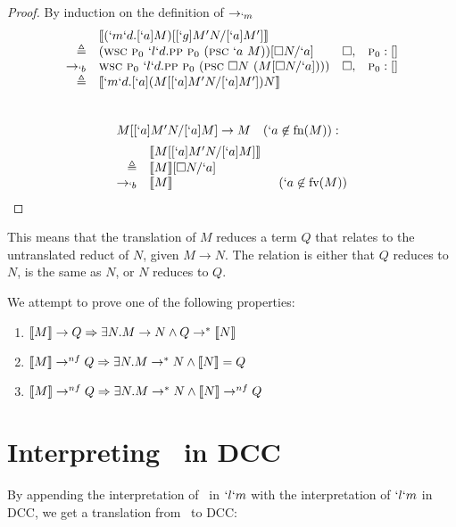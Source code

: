 \begin{proof}{By induction on the definition of $\rightarrow_{`m}$}
\[\begin{array}{rlrl}
               & \tr{(`m`d.[`a]M)[[`g]M^\prime N/[`a]M^\prime]}\\
    \triangleq & (\wsc\ \gp\ `l`d.\pp\ \gp\ (\psc\ `a\ M))[\square N/`a]         & \square, & \gp:[]  \\
    \tob\      & \wsc\ \gp\ `l`d.\pp\ \gp\ (\psc\ \square N\ (M[\square N/`a]))) & \square, & \gp:[]  \\
    \triangleq & \tr{`m`d.[`a](M[[`a]M^\prime N/[`a]M^\prime])N}
\end{array}
\]
\\ 
\[
\begin{array}{rlrl}
  \prooflabel{M[[`a]M^\prime N/[`a]M] \to M \hspace{10pt} (`a \not\in \fn(M)):} \\
               & \tr{M[[`a]M^\prime N/[`a]M]} \\
    \triangleq & \tr{M}[\square N/`a] \\
    \tob\      & \tr{M} & (`a \not\in \fv(M))
\end{array}
\]
\end{proof}

This means that the translation of $M$ reduces a term $Q$ that relates to the untranslated reduct of $N$, given $M \to N$.
The relation is either that $Q$ reduces to $N$, is the same as $N$, or $N$ reduces to $Q$.

\begin{theorem}

\end{theorem}

We attempt to prove one of the following properties:
\begin{enumerate}
  \item $\llbracket M \rrbracket \to Q \Rightarrow \exists N. M \to N \land Q \to^* \llbracket N \rrbracket$
  \item $\llbracket M \rrbracket \to^{nf} Q \Rightarrow \exists N. M \to^* N \land \llbracket N \rrbracket = Q$
  \item $\llbracket M \rrbracket \to^{nf} Q \Rightarrow \exists N. M \to^* N \land \llbracket N \rrbracket \to^{nf} Q$
\end{enumerate}

\section{Interpreting \ltry\ in DCC}

  By appending the interpretation of \ltry\ in $`l`m$ with the interpretation of
  $`l`m$ in DCC, we get a translation from \ltry\ to DCC:

